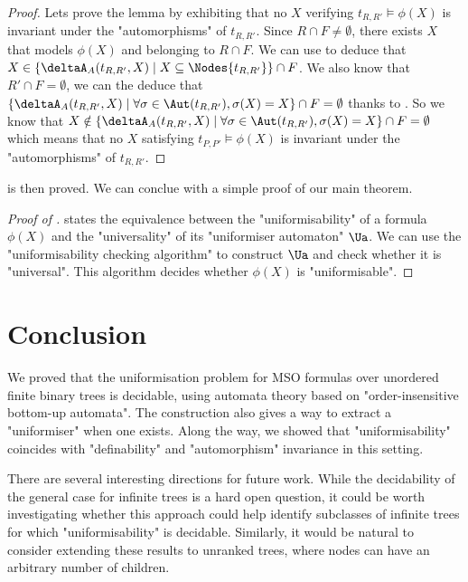 \documentclass[a4paper,UKenglish,cleveref, autoref, thm-restate]{lipics-v2021}
\begin{document}
\begin{proof}
	Lets prove the lemma by exhibiting that no $X$ verifying $t_{R,R'} \models \phi(X)$ is invariant under the "automorphisms" of $t_{R,R'}$.
	Since $R \cap F \neq \emptyset$, there exists $X$ that models $\phi(X)$ and  belonging to $R \cap F$. We can use  to deduce that
	$X \in \{ \deltaA_A (t_{R,R'},X) \mid X \subseteq \Nodes {t_{R,R'}}\} \cap F$.
	We also know that $R' \cap F = \emptyset$, we can the deduce that $\{ \deltaA_A (t_{R,R'},X) \mid \forall \sigma \in \Aut(t_{R,R'}), \sigma(X) = X\} \cap F = \emptyset$
	thanks to . So we know that $X \notin \{ \deltaA_A (t_{R,R'},X) \mid \forall \sigma \in \Aut(t_{R,R'}), \sigma(X) = X\} \cap F = \emptyset$ which means that no
	$X$ satisfying $t_{P,P'} \models \phi(X)$ is invariant under the "automorphisms" of $t_{R,R'}$.
\end{proof}

 is then proved. We can conclue with a simple proof of our main theorem.

\begin{proof}[Proof of ]
	 states the equivalence between the "uniformisability" of a formula $\phi(X)$ and the "universality" of its "uniformiser automaton" $\Ua$.
	We can use the "uniformisability checking algorithm" to construct $\Ua$ and check whether it is "universal". This algorithm decides whether $\phi(X)$ is "uniformisable".
\end{proof}

\section{Conclusion}\label{sec:conclusion}

We proved that the uniformisation problem for MSO formulas over unordered finite binary trees is decidable, using automata theory based
on "order-insensitive bottom-up automata". The construction also gives a way to extract a "uniformiser" when one exists. Along the way,
we showed that "uniformisability" coincides with "definability" and "automorphism" invariance in this setting.

There are several interesting directions for future work. While the decidability of the general case for infinite trees is a hard open question,
it could be worth investigating whether this approach could help identify subclasses of infinite trees for which "uniformisability" is decidable.
Similarly, it would be natural to consider extending these results to unranked trees, where nodes can have an arbitrary number of children.



\end{document}
